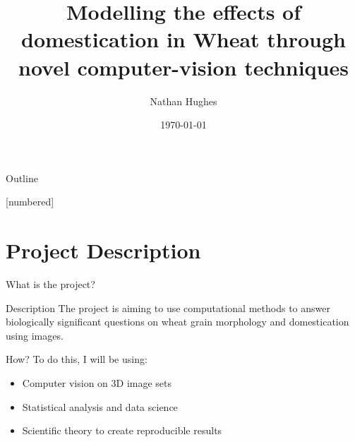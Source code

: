 \documentclass[t, aspectratio=169]{beamer}
\author{Nathan Hughes}
\date{\today}
\title{Modelling the effects of domestication in Wheat through novel computer-vision techniques}
\begin{document}
\maketitle
\begin{frame}{Outline}
\tableofcontents
\end{frame}






[numbered]

\section{Project Description}
\label{sec:org0601385}

\begin{frame}[label={sec:orga6da7d7}]{What is the project?}
\begin{block}{Description}
The project is aiming to use computational methods to answer biologically significant
 questions on wheat grain morphology and domestication using  images.
\end{block}

\begin{block}{How?}
To do this, I will be using:

\begin{itemize}
\item Computer vision on 3D image sets
\item Statistical analysis and data science
\item Scientific theory to create reproducible results
\end{itemize}
\end{block}
\end{frame}
\end{document}

